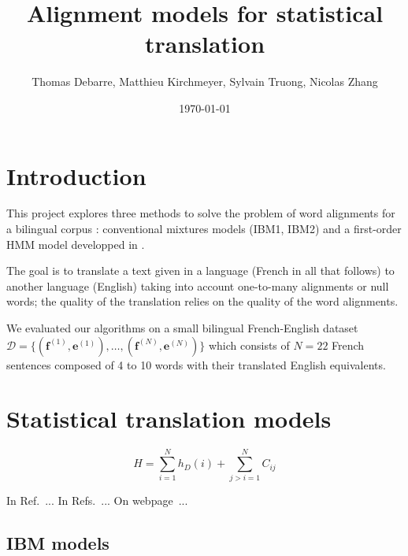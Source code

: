 \documentclass[final]{beamer}
\title
[Probabilistic Graphical Models Poster Session, Wed 4 Jan 2017] %
{ %
Alignment models for statistical translation
}
\author{ %
Thomas Debarre, Matthieu Kirchmeyer, Sylvain Truong, Nicolas Zhang
}
\institute
{\mbox{}
}
\date{\today}
\begin{document}
\begin{frame}[t]
\begin{multicols}{3}

\section{Introduction}

This project explores three methods to solve the problem of word alignments for a bilingual corpus : conventional mixtures models (IBM1, IBM2) and a first-order HMM model developped in \cite{ref1}. 

The goal is to translate a text given in a language (French in all that follows) to another language (English) taking into account one-to-many alignments or null words; the quality of the translation relies on the quality of the word alignments.


We evaluated our algorithms on a small bilingual French-English dataset $\mathcal{D} = \{ (\mathbf{f}^{(1)},\mathbf{e}^{(1)}), \dots , (\mathbf{f}^{(N)},\mathbf{e}^{(N)})\}$ which consists of $N = 22$ French sentences composed of 4 to 10 words with their translated English equivalents. 

\section{Statistical translation models}



\begin{equation}
H = \sum_{i=1}^{N} h_{D}(i) + \sum_{j>i=1}^{N} C_{ij}
\end{equation}


In Ref.~\cite{ref1}...
In Refs.~\cite{ref1,ref2}...
On webpage~\cite{web}...

\subsection{IBM models}


\end{multicols}
\end{frame}
\end{document}
